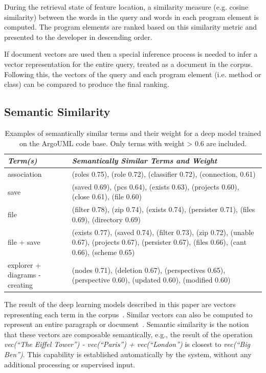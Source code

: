 During the retrieval state of feature location, a similarity measure (e.g.
cosine similarity) between the words in the query and words in each program
element is computed. The program elements are ranked based on this similarity
metric and presented to the developer in descending order.

If document vectors are used then a special inference process is needed to infer
a vector representation for the entire query, treated as a document in the
corpus. Following this, the vectors of the query and each program element (i.e.
method or class) can be compared to produce the final ranking.

\subsection{Semantic Similarity}


\begin{table}[tb]
\centering
\small
\caption{Examples of semantically similar terms and their weight for a deep model trained on
the ArgoUML code base. Only terms with weight > 0.6 are included.}
\label{tab:semsim}
\begin{tabular}{|p{}|p{}|}
\hline \hline
{\em Term(s)} & {\em Semantically Similar Terms and Weight}\\ \hline \hline
association & (roles 0.75), (role 0.72), (classifier 0.72), (connection, 0.61) \\ \hline
save & (saved 0.69), (pcs 0.64), (exists 0.63), (projects 0.60), (close 0.61), (file 0.60) \\ \hline
file & (filter 0.78), (zip 0.74), (exists 0.74), (persister 0.71), (files 0.69), (directory 0.69) \\ \hline
file + save & (exists 0.77), (saved 0.74), (filter 0.73), (zip 0.72), (unable 0.67), (projects 0.67), (persister 0.67), (files 0.66), (cant 0.66), (scheme 0.65) \\ \hline
explorer + diagrams - creating & (nodes 0.71), (deletion 0.67), (perspectives 0.65), (perspective 0.60), (updated 0.60), (modified 0.60)\\
\hline \hline
\end{tabular}
\end{table}

The result of the deep learning models described in this paper are vectors
representing each term in the corpus~\cite{mikolov_distributed_2013}. Similar
vectors can also be computed to represent an entire paragraph or
document~\cite{le_distributed_2014}. Semantic similarity is the notion that
these vectors are composable semantically, e.g., the result of the operation
{\em vec(``The Eiffel Tower'') - vec(``Paris'') + vec(``London'')} is closest to
{\em vec(``Big Ben'')}. This capability is established automatically by the
system, without any additional processing or supervised input.

